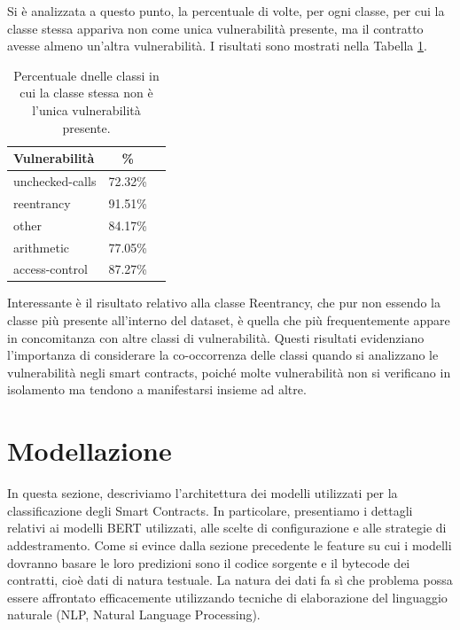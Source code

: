 \documentclass[../../Thesis.tex]{subfiles}
\begin{document}
Si è analizzata a questo punto, la percentuale di volte, per ogni classe, per cui la classe stessa appariva non come unica vulnerabilità presente, ma il contratto avesse almeno un'altra vulnerabilità. I risultati sono mostrati nella Tabella \ref{tab:multi_vuln}.

\begin{table}[h!]
    \centering
    \begin{tabular}{|l|c|c|}
        \hline
        \textbf{Vulnerabilità} & \textbf{\%} \\
        \hline
        unchecked-calls  & 72.32\% \\
        reentrancy  & 91.51\% \\
        other  & 84.17\% \\
        arithmetic  & 77.05\% \\
        access-control  & 87.27\% \\

        \hline
    \end{tabular}
    \caption{Percentuale dnelle classi in cui la classe stessa non è l'unica vulnerabilità presente.}
    \label{tab:multi_vuln}
\end{table}
Interessante è il risultato relativo alla classe Reentrancy, che pur non essendo la classe più presente all'interno del dataset, è quella che più frequentemente appare in concomitanza con altre classi di vulnerabilità.
Questi risultati evidenziano l'importanza di considerare la co-occorrenza delle classi quando si analizzano le vulnerabilità negli smart contracts, poiché molte vulnerabilità non si verificano in isolamento ma tendono a manifestarsi insieme ad altre.


\section{Modellazione}
In questa sezione, descriviamo l'architettura dei modelli utilizzati per la classificazione degli Smart Contracts. In particolare, presentiamo i dettagli relativi ai modelli BERT utilizzati, alle scelte di configurazione e alle strategie di addestramento.
Come si evince dalla sezione precedente le feature su cui i modelli dovranno basare le loro predizioni sono il codice sorgente e il bytecode dei contratti, cioè dati di natura testuale. La natura dei dati fa sì che problema possa essere affrontato efficacemente utilizzando tecniche di elaborazione del linguaggio naturale (NLP, Natural Language Processing).
\end{document}
